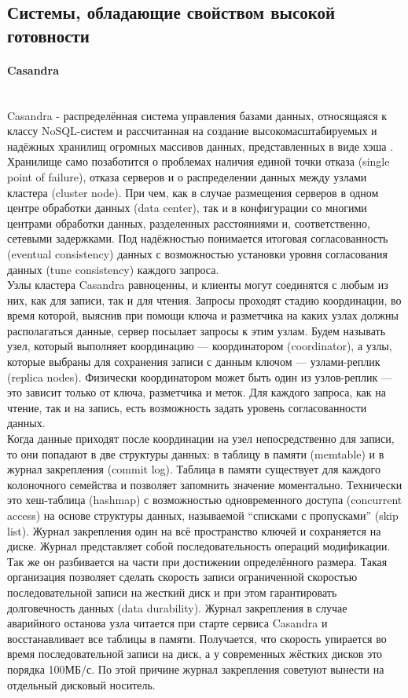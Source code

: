 \subsection{Системы, обладающие свойством высокой готовности}
\paragraph{Casandra}~\\
Casandra - распределённая система управления базами данных, относящаяся к классу NoSQL-систем и рассчитанная на создание высокомасштабируемых и надёжных хранилищ огромных массивов данных, представленных в виде хэша \autocite{casandra}. \\
Хранилище само позаботится о проблемах наличия единой точки отказа (single point of failure), отказа серверов и о распределении данных между узлами кластера (cluster node). При чем, как в случае размещения серверов в одном центре обработки данных (data center), так и в конфигурации со многими центрами обработки данных, разделенных расстояниями и, соответственно, сетевыми задержками. Под надёжностью понимается итоговая согласованность (eventual consistency) данных с возможностью установки уровня согласования данных (tune consistency) каждого запроса. \\
Узлы кластера Casandra равноценны, и клиенты могут соединятся с любым из них, как для записи, так и для чтения. Запросы проходят стадию координации, во время которой, выяснив при помощи ключа и разметчика на каких узлах должны располагаться данные, сервер посылает запросы к этим узлам. Будем называть узел, который выполняет координацию — координатором (coordinator), а узлы, которые выбраны для сохранения записи с данным ключом — узлами-реплик (replica nodes). Физически координатором может быть один из узлов-реплик — это зависит только от ключа, разметчика и меток.
Для каждого запроса, как на чтение, так и на запись, есть возможность задать уровень согласованности данных. \\
Когда данные приходят после координации на узел непосредственно для записи, то они попадают в две структуры данных: в таблицу в памяти (memtable) и в журнал закрепления (commit log). Таблица в памяти существует для каждого колоночного семейства и позволяет запомнить значение моментально. Технически это хеш-таблица (hashmap) с возможностью одновременного доступа (concurrent access) на основе структуры данных, называемой “списками с пропусками” (skip list). Журнал закрепления один на всё пространство ключей и сохраняется на диске. Журнал представляет собой последовательность операций модификации. Так же он разбивается на части при достижении определённого размера.
Такая организация позволяет сделать скорость записи ограниченной скоростью последовательной записи на жесткий диск и при этом гарантировать долговечность данных (data durability). Журнал закрепления в случае аварийного останова узла читается при старте сервиса Casandra и восстанавливает все таблицы в памяти. Получается, что скорость упирается во время последовательной записи на диск, а у современных жёстких дисков это порядка 100МБ/с. По этой причине журнал закрепления советуют вынести на отдельный дисковый носитель.

